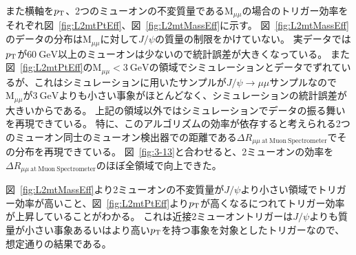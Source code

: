 また横軸を$p_\mathrm{T}$、2つのミューオンの不変質量である$\mathrm{M}_{\mu\mu}$の場合のトリガー効率をそれぞれ図~\ref{fig:L2mtPtEff}、図~\ref{fig:L2mtMassEff}に示す。
図~\ref{fig:L2mtMassEff}のデータの分布は$\mathrm{M}_{\mu\mu}$に対して$J/\psi$の質量の制限をかけていない。
実データでは$p_\mathrm{T}$が$\SI{60}{\GeV}$以上のミューオンは少ないので統計誤差が大きくなっている。
また図~\ref{fig:L2mtPtEff}の$\mathrm{M}_{\mu\mu}<\SI{3}{\GeV}$の領域でシミュレーションとデータでずれているが、これはシミュレーションに用いたサンプルが$J/\psi\rightarrow\mu\mu$サンプルなので$\mathrm{M}_{\mu\mu}$が$\SI{3}{\GeV}$よりも小さい事象がほとんどなく、シミュレーションの統計誤差が大きいからである。
上記の領域以外ではシミュレーションでデータの振る舞いを再現できている。
特に、このアルゴリズムの効率が依存すると考えられる2つのミューオン同士のミューオン検出器での距離である$\Delta R_{\mu\mu~\mathrm{at~Muon~Spectrometer}}$でその分布を再現できている。
図~\ref{fig:3-13}と合わせると、2ミューオンの効率を$\Delta R_{\mu\mu~\mathrm{at~Muon~Spectrometer}}$のほぼ全領域で向上できた。

図~\ref{fig:L2mtMassEff}より2ミューオンの不変質量が$J/\psi$より小さい領域でトリガー効率が高いこと、図~\ref{fig:L2mtPtEff}より$p_\mathrm{T}$が高くなるにつれてトリガー効率が上昇していることがわかる。
これは近接2ミューオントリガーは$J/\psi$よりも質量が小さい事象あるいはより高い$p_\mathrm{T}$を持つ事象を対象としたトリガーなので、想定通りの結果である。